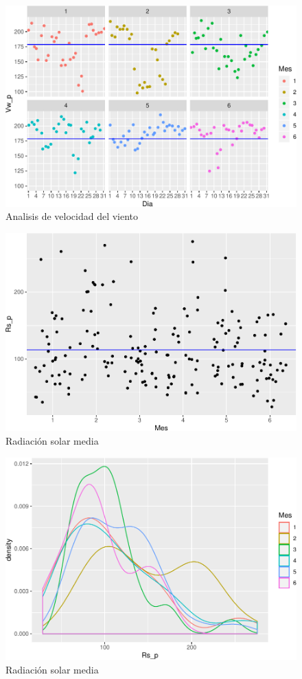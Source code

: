 \documentclass[conference,final,]{IEEEtran}
\makeatletter
\def\maxwidth{\ifdim\Gin@nat@width>\linewidth\linewidth
\else\Gin@nat@width\fi}
\let\Oldincludegraphics\includegraphics
\renewcommand{\includegraphics}[1]{\Oldincludegraphics[width=\maxwidth]{#1}}
\makeatother
\begin{document}
\begin{figure}
\centering
\includegraphics{Hidrology_files/figure-latex/unnamed-chunk-11-1.pdf}
\caption{Analisis de velocidad del viento}
\end{figure}

\begin{figure}
\centering
\includegraphics{Hidrology_files/figure-latex/unnamed-chunk-12-1.pdf}
\caption{Radiación solar media}
\end{figure}

\begin{figure}
\centering
\includegraphics{Hidrology_files/figure-latex/unnamed-chunk-13-1.pdf}
\caption{Radiación solar media}
\end{figure}
\end{document}
